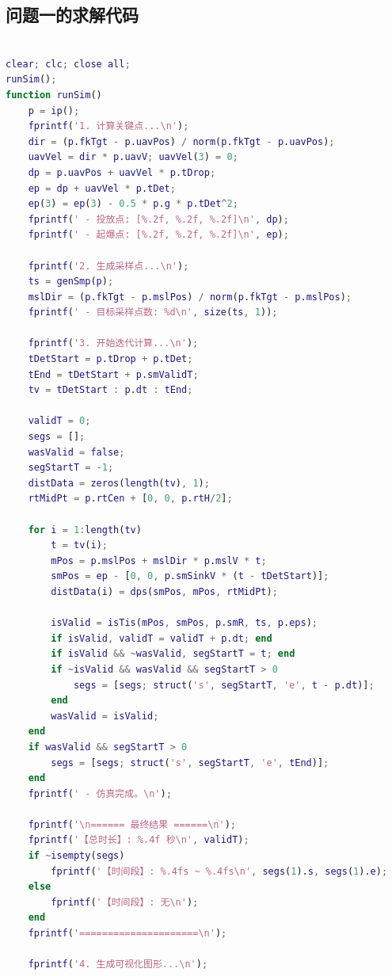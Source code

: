 \documentclass[5pt, withoutpreface,bwprint]{cumcmthesis} %
\begin{document}
\begin{appendices}
\section{问题一的求解代码}
\begin{lstlisting}[language=matlab]

clear; clc; close all;
runSim();
function runSim()
    p = ip();
    fprintf('1. 计算关键点...\n');
    dir = (p.fkTgt - p.uavPos) / norm(p.fkTgt - p.uavPos);
    uavVel = dir * p.uavV; uavVel(3) = 0;
    dp = p.uavPos + uavVel * p.tDrop;
    ep = dp + uavVel * p.tDet;
    ep(3) = ep(3) - 0.5 * p.g * p.tDet^2;
    fprintf(' - 投放点: [%.2f, %.2f, %.2f]\n', dp);
    fprintf(' - 起爆点: [%.2f, %.2f, %.2f]\n', ep);

    fprintf('2. 生成采样点...\n');
    ts = genSmp(p);
    mslDir = (p.fkTgt - p.mslPos) / norm(p.fkTgt - p.mslPos);
    fprintf(' - 目标采样点数: %d\n', size(ts, 1));

    fprintf('3. 开始迭代计算...\n');
    tDetStart = p.tDrop + p.tDet;
    tEnd = tDetStart + p.smValidT;
    tv = tDetStart : p.dt : tEnd;

    validT = 0;
    segs = [];
    wasValid = false;
    segStartT = -1;
    distData = zeros(length(tv), 1);
    rtMidPt = p.rtCen + [0, 0, p.rtH/2];

    for i = 1:length(tv)
        t = tv(i);
        mPos = p.mslPos + mslDir * p.mslV * t;
        smPos = ep - [0, 0, p.smSinkV * (t - tDetStart)];
        distData(i) = dps(smPos, mPos, rtMidPt);
        
        isValid = isTis(mPos, smPos, p.smR, ts, p.eps);
        if isValid, validT = validT + p.dt; end
        if isValid && ~wasValid, segStartT = t; end
        if ~isValid && wasValid && segStartT > 0
            segs = [segs; struct('s', segStartT, 'e', t - p.dt)];
        end
        wasValid = isValid;
    end
    if wasValid && segStartT > 0
        segs = [segs; struct('s', segStartT, 'e', tEnd)];
    end
    fprintf(' - 仿真完成。\n');

    fprintf('\n====== 最终结果 ======\n');
    fprintf('【总时长】: %.4f 秒\n', validT);
    if ~isempty(segs)
        fprintf('【时间段】: %.4fs ~ %.4fs\n', segs(1).s, segs(1).e);
    else
        fprintf('【时间段】: 无\n');
    end
    fprintf('=====================\n');

    fprintf('4. 生成可视化图形...\n');
    

\end{lstlisting}
\end{appendices}
\end{document}
